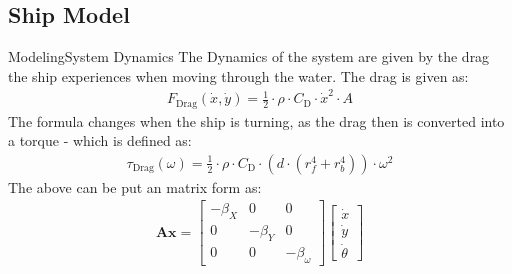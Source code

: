 \subsection{Ship Model}
\begin{frame}{Modeling}{System Dynamics}
The Dynamics of the system are given by the drag the ship experiences when moving through the water. The drag is given as:
\begin{align}
F_\text{Drag}(\dot{x},\dot{y}) = \frac{1}{2} \cdot \rho \cdot C_\text{D} \cdot \dot{x}^2 \cdot A 
\end{align}
The formula changes when the ship is turning, as the drag then is converted into a torque - which is defined as:
\begin{align}
\tau_\text{Drag}(\omega) = \frac{1}{2} \cdot \rho \cdot C_\text{D} \cdot (d \cdot (r_f^4 + r_b^4)) \cdot \omega^2
\end{align}
The above can be put an matrix form as:
\begin{align}
\mathbf{A}\mathbf{x} = \begin{bmatrix}
-\beta_X & 0 & 0\\
0 & -\beta_Y & 0\\
0 & 0 & -\beta_\omega
\end{bmatrix}\begin{bmatrix}
\dot{x}\\
\dot{y}\\
\dot{\theta}
\end{bmatrix}
\end{align}
\end{frame}

